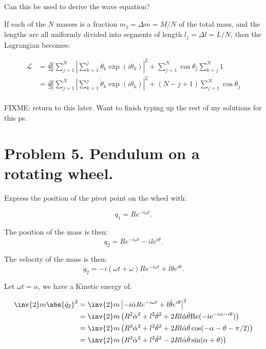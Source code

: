 \documentclass{article}
\newcommand{\Abs}[1]{\left\lvert{#1}\right\rvert}
\newcommand{\LL}[0]{\mathcal{L}}
\newcommand{\dotalpha}[0]{\dot{\alpha}}
\newcommand{\dotomega}[0]{\dot{\omega}}
\newcommand{\dottheta}[0]{\dot{\theta}}
\newcommand{\qdot}[0]{\dot{q}}
\begin{document}
Can this be used to derive the wave equation?

If each of the $N$ masses is a fraction $m_j = \Delta m = M/N$ of the total mass, and the lengths are all uniformly divided into segments of length
$l_j = \Delta l = L/N$, then the Lagrangian becomes:

\begin{align*}
\LL 
&= \frac{\Delta l}{2g} \sum_{j=1}^N \Abs{ \sum_{k=1}^j \dottheta_k \exp(i\theta_k) }^2 + \sum_{j=1}^N \cos\theta_j \sum_{k=j}^N 1 \\
&= \frac{\Delta l}{2g} \sum_{j=1}^N \Abs{ \sum_{k=1}^j \dottheta_k \exp(i\theta_k) }^2 + ( N - j + 1 ) \sum_{j=1}^N \cos\theta_j \\
\end{align*}

FIXME: return to this later.  Want to finish typing up the rest of my solutions for this ps.

\section{ Problem 5.  Pendulum on a rotating wheel. }

Express the position of the pivot point on the wheel with:

\begin{equation*}
q_1 = R e^{-i\omega t}.
\end{equation*}

The position of the mass is then:
\begin{equation*}
q_2 = R e^{-i\omega t} - il e^{i\theta}.
\end{equation*}

The velocity of the mass is then:
\begin{equation*}
\qdot_2 = -i(\dotomega t + \omega)R e^{-i\omega t} + l \dottheta e^{i\theta}.
\end{equation*}

Let $\omega t = \alpha$, we have a Kinetic energy of:

\begin{align*}
\inv{2} m \abs{\qdot_2}^2
&= \inv{2} m \Abs{-i\dotalpha R e^{-i\omega t} + l \dottheta e^{i\theta}}^2 \\
&= \inv{2} m \left( R^2 \dotalpha^2 + l^2 \dottheta^2 + 2 R l \dotalpha \dottheta \text{Re}( -i e^{-i\alpha -i\theta}) \right) \\
&= \inv{2} m \left( R^2 \dotalpha^2 + l^2 \dottheta^2 + 2 R l \dotalpha \dottheta \cos( -\alpha -\theta -\pi/2 ) \right) \\
&= \inv{2} m \left( R^2 \dotalpha^2 + l^2 \dottheta^2 - 2 R l \dotalpha \dottheta \sin( \alpha +\theta ) \right) \\
\end{align*}
\end{document}
